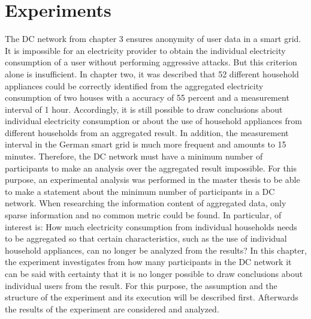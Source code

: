 \chapter{Experiments}
\label{sec:experiments}


The DC network from chapter 3 ensures anonymity of user data in a smart grid. It is impossible for an electricity provider to obtain the individual electricity consumption of a user without performing aggressive attacks. But this criterion alone is insufficient. In chapter two, it was described that 52 different household appliances could be correctly identified from the aggregated electricity consumption of two houses with a accuracy of 55 percent and a measurement interval of 1 hour. Accordingly, it is still possible to draw conclusions about individual electricity consumption or about the use of household appliances from different households from an aggregated result. In addition, the measurement interval in the German smart grid is much more frequent and amounts to 15 minutes. Therefore, the DC network must have a minimum number of participants to make an analysis over the aggregated result impossible. For this purpose, an experimental analysis was performed in the master thesis to be able to make a statement about the minimum number of participants in a DC network. When researching the information content of aggregated data, only sparse information and no common metric could be found. In particular, of interest is: How much electricity consumption from individual households needs to be aggregated so that certain characteristics, such as the use of individual household appliances, can no longer be analyzed from the results? In this chapter, the experiment investigates from how many participants in the DC network it can be said with certainty that it is no longer possible to draw conclusions about individual users from the result. For this purpose, the assumption and the structure of the experiment and its execution will be described first. Afterwards the results of the experiment are considered and analyzed.
